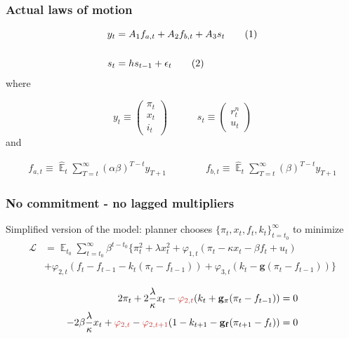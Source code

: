 \documentclass[10pt]{beamer}
\newcommand\numberthis{\addtocounter{equation}{1}\tag{\theequation}} %
\DeclareMathOperator{\E}{\mathbb{E}}
\begin{document}
\begin{frame}[plain]  %
	\frametitle{Actual laws of motion}
	\label{ALMs}

 \begin{align*}
y_t & = A_1 f_{a,t} + A_2 f_{b,t} + A_3 s_t \label{LOM_LR} \numberthis \\
\\
s_t & = h s_{t-1} + \epsilon_t \label{exog} \numberthis
\end{align*}
where

\begin{equation}
 y_t \equiv \begin{pmatrix} \pi_t \\ x_t \\ i_t
 \end{pmatrix} 
 \quad \quad \quad 
  s_t  \equiv \begin{pmatrix} r_t^n \\ u_t 
 \end{pmatrix} 
\end{equation}
and

  \begin{align}
f_{a,t}  \equiv  \hat{\E}_t\sum_{T=t}^{\infty} (\alpha\beta)^{T-t } y_{T+1} \quad \quad \quad \quad 
f_{b,t}  \equiv \hat{\E}_t\sum_{T=t}^{\infty} (\beta)^{T-t } y_{T+1} \label{fafb}
\end{align}

\hyperlink{aggregate_LOMS}{}	


\end{frame}



\begin{frame}[plain]  %
	\frametitle{No commitment - no lagged multipliers}
	\label{no_commitment_intuition}
	
	Simplified version of the model: planner chooses $\{\pi_t, x_t, f_t, k_t\}_{t=t_0}^{\infty}$ to minimize
 \begin{align*}
\mathcal{L} &= \E_{t_0}\sum_{t=t_0}^{\infty} \beta^{t-t_0}\bigg\{ \pi_t^2  + \lambda x_t^2 + \varphi_{1,t} (\pi_t -\kappa x_t- \beta f_t +u_t) \\ &+ \varphi_{2,t}(f_t - f_{t-1} -k_t(\pi_t - f_{t-1})) + \varphi_{3,t}(k_t- \mathbf{g}(\pi_t - f_{t-1})) \bigg\}
 \end{align*}

 \begin{align}
  2\pi_t +2\frac{\lambda}{\kappa}x_t -\textcolor{brownreddark}{\varphi_{2,t}}(k_t + \mathbf{g_{\pi}}(\pi_t -f_{t-1}))& = 0 \label{simpleFOC1} \\
  -2\beta\frac{\lambda}{\kappa}x_t + \textcolor{brownreddark}{\varphi_{2,t}} -\textcolor{brownreddark}{\varphi_{2,t+1}}(1-k_{t+1} -\mathbf{g_{f}}(\pi_{t+1} -f_{t})) & = 0 \label{simpleFOC2} 
 \end{align}

  
\hyperlink{no_commitment}{}	


\end{frame}
\end{document}
